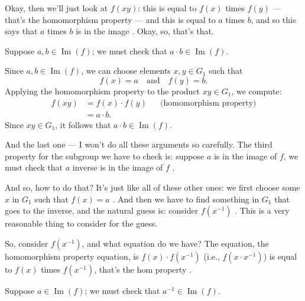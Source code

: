 \begin{proofWrapper}
\begin{speech}[00:02:19 - 00:03:27]
Okay, then we'll just look at $f(xy)$: this is equal to $f(x)$ times $f(y)$ --- that's the homomorphism property --- and this is equal to $a$ times $b$, and so this says that $a$ times $b$ is in the image . Okay, so, that's that.
\end{speech}

\begin{content}
Suppose $a, b \in \operatorname{Im}(f)$; we must check that $a \cdot b \in \operatorname{Im}(f)$.

Since $a, b \in \operatorname{Im}(f)$, we can choose elements $x, y \in G_1$ such that
\[
f(x) = a \quad \text{and} \quad f(y) = b.
\]
Applying the homomorphism property to the product $xy \in G_1$, we compute:
\begin{align*}
f(xy) &= f(x) \cdot f(y) && \text{(homomorphism property)} \\
&= a \cdot b.
\end{align*}
Since $xy \in G_1$, it follows that $a \cdot b \in \operatorname{Im}(f)$.
\end{content}

\begin{speech}[00:03:27 - 00:04:34]
And the last one --- I won't do all these arguments so carefully. The third property for the subgroup we have to check is: suppose $a$ is in the image of $f$, we must check that $a$ inverse is in the image of $f$ .

And so, how to do that? It's just like all of these other ones: we first choose some $x$ in $G_1$ such that $f(x) = a$ . And then we have to find something in $G_1$ that goes to the inverse, and the natural guess is: consider $f(x^{-1})$ . This is a very reasonable thing to consider for the guess.

So, consider $f(x^{-1})$, and what equation do we have? The equation, the homomorphism property equation, is $f(x) \cdot f(x^{-1})$ (i.e., $f(x \cdot x^{-1})$) is equal to $f(x)$ times $f(x^{-1})$, that's the hom property .
\end{speech}

\begin{content}
Suppose $a \in \operatorname{Im}(f)$; we must check that $a^{-1} \in \operatorname{Im}(f)$.


\end{content}
\end{proofWrapper}
